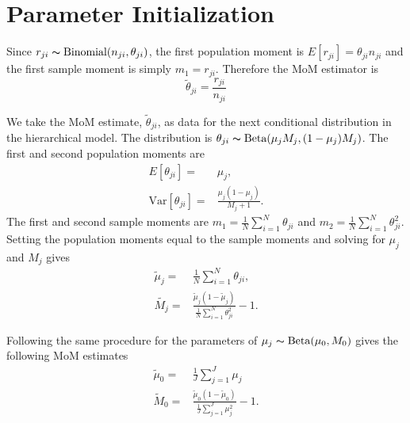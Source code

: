 \documentclass[11pt,reqno]{amsart}
\begin{document}
\appendix
\section{Parameter Initialization}\label{sec:appendix_mom}
Since $r_{ji} \thicksim \text{Binomial}(n_{ji}, \theta_{ji})$, the first population moment is  $E[r_{ji}] = \theta_{ji} n_{ji}$ and the first sample moment is simply $m_1 = r_{ji}$. Therefore the MoM estimator is 
\begin{equation}
	\tilde{\theta}_{ji} = \frac{r_{ji}} {n_{ji}}
\end{equation}

We take the MoM estimate, $\tilde{\theta}_{ji}$, as data for the next conditional distribution in the hierarchical model. The distribution is $\theta_{ji} \thicksim \text{Beta}(\mu_jM_j, (1-\mu_j)M_j)$. The first and second population moments are
\begin{eqnarray}
	E[\theta_{ji}] =& \mu_j,\\
	\text{Var}[\theta_{ji}] =& \frac{\mu_j(1-\mu_j)} { M_j + 1 }.
\end{eqnarray}
The first and second sample moments are $m_1 = \frac{1}{N}\sum_{i=1}^N \theta_{ji}$ and $m_2 = \frac{1}{N}\sum_{i=1}^N \theta_{ji}^2$. Setting the population moments equal to the sample moments and solving for $\mu_j$ and $M_j$ gives
\begin{eqnarray}
	\tilde{\mu}_j =& \frac{1}{N} \sum_{i=1}^N \theta_{ji}, \\
	\tilde{M_j} =& \frac{ \tilde{\mu}_j (1 - \tilde{\mu}_j ) } { \frac{1}{N} \sum_{i=1}^N \theta_{ji}^2 } -1.
\end{eqnarray}

Following the same procedure for the parameters of $\mu_j \thicksim \text{Beta}(\mu_0, M_0)$ gives the following MoM estimates
\begin{eqnarray}
	\tilde{\mu}_0 =& \frac{1}{J} \sum_{j=1}^J \mu_j \\
	\tilde{M}_0 =& \frac{ \tilde{\mu}_0 (1 - \tilde{\mu}_0 ) } {\frac{1}{J} \sum_{j=1}^J \mu_j^2 } -1.
\end{eqnarray}



\end{document}
